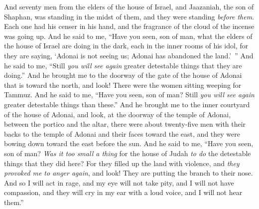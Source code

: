 \begin{biblechapter}
\verse And seventy men from the elders of the house of Israel, and Jaazaniah, the son of Shaphan, was standing in the midst of them, and they were standing \textit{before them}. Each one had his censer in his hand, and the fragrance of the cloud of the incense was going up.
\verse And he said to me, “Have you seen, son of man, what the elders of the house of Israel are doing in the dark, each in the inner rooms of his idol, for they are saying, ‘Adonai is not seeing us; Adonai has abandoned the land.’ ”
\verse And he said to me, “Still \textit{you will see again} greater detestable things that they are doing.”
\verse And he brought me to the doorway of the gate of the house of Adonai that is toward the north, and look! There were the women sitting weeping for Tammuz.
\verse And he said to me, “Have you seen, son of man? Still \textit{you will see again} greater detestable things than these.”
\verse And he brought me to the inner courtyard of the house of Adonai, and look, at the doorway of the temple of Adonai, between the portico and the altar, there were about twenty-five men with their backs to the temple of Adonai and their faces toward the east, and they were bowing down toward the east before the sun.
\verse And he said to me, “Have you seen, son of man? \textit{Was it too small a thing} for the house of Judah \textit{to do} the detestable things that they did here? For they filled up the land with violence, and \textit{they provoked me to anger again}, and look! They are putting the branch to their nose.
\verse And so I will act in rage, and my eye will not take pity, and I will not have compassion, and they will cry in my ear with a loud voice, and I will not hear them.”
\end{biblechapter}

